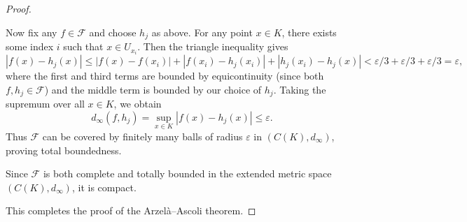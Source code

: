 \begin{proof}
\begin{enumerate}
    Now fix any $f \in \mathcal{F}$ and choose $h_j$ as above. For any point $x \in K$, there exists some index $i$ such that $x \in U_{x_i}$. Then the triangle inequality gives $$|f(x) - h_j(x)| \leq |f(x) - f(x_i)| + |f(x_i) - h_j(x_i)| + |h_j(x_i) - h_j(x)| < \varepsilon/3 + \varepsilon/3 + \varepsilon/3 = \varepsilon,$$ where the first and third terms are bounded by equicontinuity (since both $f, h_j \in \mathcal{F}$) and the middle term is bounded by our choice of $h_j$. Taking the supremum over all $x \in K$, we obtain $$d_\infty(f,h_j) = \sup_{x \in K} |f(x) - h_j(x)| \leq \varepsilon.$$ Thus $\mathcal{F}$ can be covered by finitely many balls of radius $\varepsilon$ in $(C(K), d_\infty)$, proving total boundedness.

    Since $\mathcal{F}$ is both complete and totally bounded in the extended metric space $(C(K), d_\infty)$, it is compact.
\end{enumerate}
This completes the proof of the Arzelà–Ascoli theorem.
\end{proof}
